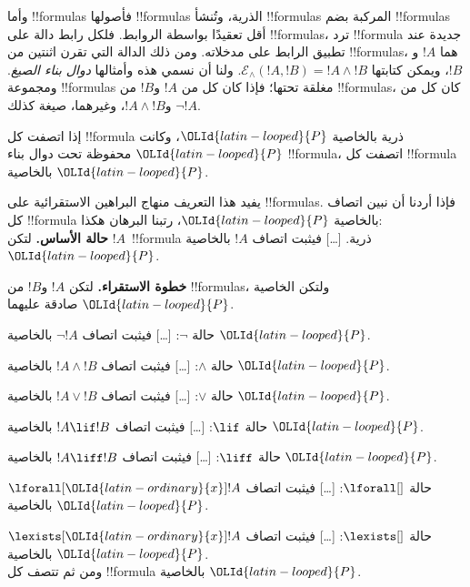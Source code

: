 \documentclass[../../../include/open-logic-section]{subfiles}
\begin{document}
\begin{explain}
وأما !!{formula}s فأصولها !!{formula}s الذرية، وتُنشأ !!{formula}s المركبة
بضم !!{formula}s أقل تعقيدًا بواسطة الروابط. فلكل رابط دالة على
!!{formula}s، ترد !!{formula} جديدة عند تطبيق الرابط على مدخلاته. ومن
ذلك الدالة التي تقرن اثنتين من !!{formula}s، هما $!A$ و$!B$، ويمكن كتابتها
$\mathcal E _\land (!A, !B) = !A \land !B$. ولنا أن نسمي هذه وأمثالها
\emph{دوال بناء الصيغ}. ومجموعة !!{formula}s مغلقة تحتها؛ فإذا كان كل من
$!A$ و$!B$ من !!{formula}s، كان كل من $\lnot !A$ و$!A \land !B$،
وغيرهما، صيغة كذلك.
\end{explain}

\begin{defn}
إذا اتصفت كل !!{formula} ذرية بالخاصية $\OLId{latin-looped}{P}$، وكانت $\OLId{latin-looped}{P}$ محفوظة تحت دوال
بناء !!{formula}، اتصفت كل !!{formula} بالخاصية $\OLId{latin-looped}{P}$.
\end{defn}

\begin{explain}
يفيد هذا التعريف منهاج البراهين الاستقرائية على !!{formula}s. فإذا أردنا
أن نبين اتصاف كل !!{formula} بالخاصية $\OLId{latin-looped}{P}$، رتبنا البرهان هكذا:\\

\textbf{حالة الأساس.} لتكن $!A$~!!{formula} ذرية. [\ldots]
فيثبت اتصاف $!A$ بالخاصية $\OLId{latin-looped}{P}$.

\textbf{خطوة الاستقراء.} لتكن $!A$ و$!B$ من !!{formula}s، ولتكن
الخاصية $\OLId{latin-looped}{P}$ صادقة عليهما.

حالة $\lnot$: [\ldots] فيثبت اتصاف $\lnot !A$ بالخاصية $\OLId{latin-looped}{P}$.

حالة $\land$: [\ldots] فيثبت اتصاف $!A \land !B$ بالخاصية $\OLId{latin-looped}{P}$.

حالة $\lor$: [\ldots] فيثبت اتصاف $!A \lor !B$ بالخاصية $\OLId{latin-looped}{P}$.

حالة $\lif$: [\ldots] فيثبت اتصاف $!A \lif !B$ بالخاصية $\OLId{latin-looped}{P}$.

حالة $\liff$: [\ldots] فيثبت اتصاف $!A \liff !B$ بالخاصية $\OLId{latin-looped}{P}$.

حالة $\lforall[]$: [\ldots] فيثبت اتصاف $\lforall[\OLId{latin-ordinary}{x}] !A$ بالخاصية $\OLId{latin-looped}{P}$.

حالة $\lexists[]$: [\ldots] فيثبت اتصاف $\lexists[\OLId{latin-ordinary}{x}] !A$ بالخاصية $\OLId{latin-looped}{P}$. \\

ومن ثم تتصف كل !!{formula} بالخاصية $\OLId{latin-looped}{P}$.
\end{explain}
\end{document}
